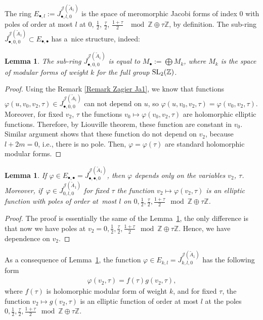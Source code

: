 \documentclass[10pt,a4paper]{amsart}
\numberwithin{equation}{section}
\newtheorem{Lemma}[Theorem]{Lemma}
\newcommand{\Ja}{\mathcal{J}}
\begin{document}
The ring $E_{\bullet,l}:=J_{\bullet,l,0}^{\Ja(\tilde A_1)}$ is the space of meromorphic Jacobi forms of index $0$ with poles of order at most $l$ at $0$, $\frac{1}{2}$, $\frac{\tau}{2}$, $\frac{1+\tau}{2}$ $\mod \mathbb{Z}\oplus\tau\mathbb{Z}$, by definition. The sub-ring $J_{\bullet,0,0}^{\Ja(\tilde A_1)}\subset E_{\bullet,\bullet}$ has a~nice structure, indeed:
\begin{Lemma}\label{lemmamodular Jtildea1}
The sub-ring $J_{\bullet,0,0}^{\Ja(\tilde A_1)}$ is equal to $M_{\bullet}:=\bigoplus M_{k}$, where $M_k$ is the space of modular forms of weight $k$ for the full group ${\rm SL}_2(\mathbb{Z})$.
\end{Lemma}

\begin{proof}
Using the Remark \ref{Remark Zagier Ja1}, we know that functions $\varphi(u,v_0,v_2,\tau)\in J_{\bullet,0,0}^{\Ja(\tilde A_1)}$ can not depend on $u$, so $\varphi(u,v_0,v_2,\tau)=\varphi(v_0,v_2,\tau)$. Moreover, for fixed $v_2$, $\tau$ the functions $v_0\mapsto \varphi(v_0,v_2,\tau) $ are holomorphic elliptic functions. Therefore, by Liouville theorem, these function are constant in $v_0$. Similar argument shows that these function do not depend on $v_2$, because $l+2m=0$, i.e., there is no pole. Then, $\varphi=\varphi(\tau)$ are standard holomorphic modular forms.
\end{proof}

\begin{Lemma}\label{ringcoef Jtildea1}
If $\varphi \in E_{\bullet,\bullet}=J_{\bullet,\bullet,0}^{\Ja(\tilde A_1)}$, then $\varphi$ depends only on the variables $v_2$, $\tau$. Moreover, if~$\varphi\in J_{0,l,0}^{\Ja(\tilde A_1)}$ for fixed $\tau$ the function $v_2\mapsto \varphi(v_2,\tau)$ is an elliptic function with poles of order at~most $l$ on $0,\frac{1}{2}, \frac{\tau}{2}, \frac{1+\tau}{2}\mod \mathbb{Z}\oplus\tau\mathbb{Z}$.
\end{Lemma}

\begin{proof}
The proof is essentially the same of the Lemma~\ref{lemmamodular Jtildea1}, the only difference is that now we have poles at $v_2=0,\frac{1}{2}, \frac{\tau}{2}, \frac{1+\tau}{2}\mod \mathbb{Z}\oplus\tau\mathbb{Z}$. Hence, we have dependence on $v_2$.
\end{proof}

As a consequence of Lemma~\ref{ringcoef Jtildea1}, the function $\varphi \in E_{k,l}=J_{k,l,0}^{\Ja(\tilde A_1)}$ has the following form
\begin{gather*}
\varphi(v_2,\tau)=f(\tau)g(v_2,\tau),
\end{gather*}
 where $f(\tau)$ is holomorphic modular form of weight $k$, and for fixed $\tau$, the function $v_2\mapsto g(v_2,\tau)$ is an elliptic function of order at most $l$ at the poles $0,\frac{1}{2}, \frac{\tau}{2}, \frac{1+\tau}{2}\mod \mathbb{Z}\oplus\tau\mathbb{Z}$.
\end{document}
